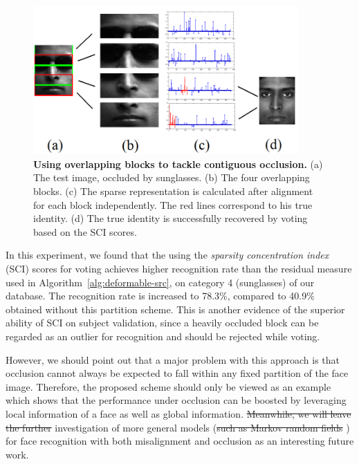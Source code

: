 \documentclass[12pt,journal,draftcls,letterpaper,onecolumn]{IEEEtran}
\providecommand{\DIFadd}[1]{{\protect\color{blue}\uwave{#1}}} %
\providecommand{\DIFdel}[1]{{\protect\color{red}\sout{#1}}}                      %
\providecommand{\DIFaddbegin}{} %
\providecommand{\DIFaddend}{} %
\providecommand{\DIFdelbegin}{} %
\providecommand{\DIFdelend}{} %
\begin{document}
\begin{figure}
\centerline{
\includegraphics[width=4in]{figures_pami/occ_block.png}\vspace{-0.2in}}
\caption{{\bf Using overlapping blocks to tackle contiguous occlusion.} (a) The test image, occluded by sunglasses. (b) The four overlapping blocks. (c) The sparse representation is calculated after alignment for each block independently. The red lines correspond to his true identity. (d) The true identity is successfully recovered by voting based on the SCI scores.}
\label{fig:occ-block}
\vspace{-.5in}
\end{figure}

In this experiment, we found that the using the \emph{sparsity
concentration index} (SCI) scores for voting achieves higher
recognition rate than the residual measure used in Algorithm~\ref{alg:deformable-src}, on
category 4 (sunglasses) of our database. The recognition rate
is increased to 78.3\%, compared to 40.9\% obtained without
this partition scheme. This is another evidence of the superior
ability of SCI on subject validation, since a heavily occluded
block can be regarded as an outlier for recognition and should
be rejected while voting.

However, we should point out that a major problem with this
approach is that occlusion cannot always be expected to fall within
 any fixed partition of the face image. Therefore, the
proposed scheme should only be viewed as an example which shows
that the performance under occlusion can be boosted by
leveraging local information of a face as well as global information. \DIFdelbegin \DIFdel{Meanwhile, we will
leave the further }\DIFdelend \DIFaddbegin \DIFadd{We 
leave the }\DIFaddend investigation of more general models (\DIFdelbegin \DIFdel{such as Markov
random fields }\DIFdelend \DIFaddbegin \DIFadd{e.g., MRF }\DIFaddend \cite{ZhouZ2009}) for face
recognition with both misalignment and occlusion as an
interesting future work.
\DIFdelbegin %
\DIFdelend 
\end{document}
